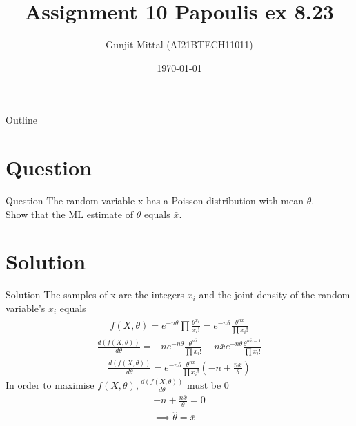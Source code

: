 \documentclass{beamer}
\title{Assignment 10 Papoulis ex 8.23}
\author{Gunjit Mittal (AI21BTECH11011)}
\date{\today}
\providecommand{\brak}[1]{\ensuremath{\left(#1\right)}}
\theoremstyle{remark}
\numberwithin{equation}{section}
\numberwithin{figure}{section}
\numberwithin{table}{section}
\begin{document}
 
\begin{frame}
  \titlepage{}
\end{frame}
\logo{}
\begin{frame}{Outline}
  \tableofcontents
\end{frame}
\section{Question}
\begin{frame}{Question}
The random variable x has a Poisson distribution with mean $\theta$.\\Show that the ML estimate of $\theta$ equals $\bar{x}$.
\end{frame}
\section{Solution} 
\begin{frame}{Solution}
  The samples of x are the integers $x_i$ and the joint density of the random variable's $x_i$ equals
  \begin{align}
    f(X,\theta) = e^{-n\theta} \prod \frac{\theta^{x_i}}{x_i!} = e^{-n\theta} \frac{\theta^{n\bar{x}}}{\prod x_i!}
  \end{align}
  \begin{align}
    \frac{d(f(X,\theta))}{d\theta} = -ne^{-n\theta} \frac{\theta^{n\bar{x}}}{\prod x_i!} + n\bar{x}e^{-n\theta} \frac{\theta^{n\bar{x}-1}}{\prod x_i!}
  \end{align}
  \begin{align}
    \frac{d(f(X,\theta))}{d\theta} = e^{-n\theta} \frac{\theta^{n\bar{x}}}{\prod x_i!} \brak{-n + 
    \frac{n\bar{x}}{\theta}}
  \end{align}
  In order to maximise $f(X,\theta),\frac{d(f(X,\theta))}{d\theta}$ must be 0
  \begin{align}
    -n + \frac{n\bar{x}}{\theta} = 0\\
    \implies  \hat{\theta} = \bar{x}
  \end{align}
\end{frame}
\end{document}
